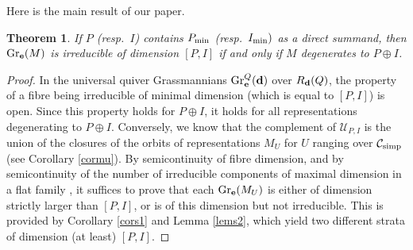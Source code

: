 \documentclass{amsart}
\numberwithin{equation}{section}
\newtheorem{thm}{Theorem}[section]
\newtheorem{lem}[thm]{Lemma}
\theoremstyle{remark}
\begin{document}
Here is the main result of our paper.

\begin{thm} If $P$ (resp.~$I$) contains $P_{\rm min}$ (resp.~$I_{\rm min})$ as a direct summand, then ${\rm Gr}_{\bf e}(M)$ is irreducible of dimension $[P,I]$ if and only if $M$ degenerates to $P\oplus I$.
\end{thm}

\begin{proof} In the universal quiver Grassmannians ${\rm Gr}_{\bf e}^Q({\bf d})$ over $R_{\bf d}(Q)$, 
the property of a fibre being irreducible of minimal dimension (which is equal to $[P,I]$) is open. 
Since this property holds for $P\oplus I$, it holds for all representations degenerating to $P\oplus I$. 
Conversely, we know that the complement of $\mathcal{U}_{P,I}$ is the union of the closures of the orbits of representations $M_U$ for $U$ ranging over $\mathcal{C}_{\rm simp}$ (see Corollary \ref{cormu}). 
By semicontinuity of fibre dimension, and by semicontinuity of the number of irreducible components of maximal dimension in a flat family \cite[Theorem2]{CFFFR17}, 
it suffices to prove that each ${\rm Gr}_{\bf e}(M_U)$ is either of dimension strictly larger than 
$[P,I]$, or is of this dimension but not irreducible. 
This is provided by Corollary \ref{cors1} and Lemma \ref{lems2}, which yield two different strata of dimension (at least) $[P,I]$.
\end{proof}








\end{document}
